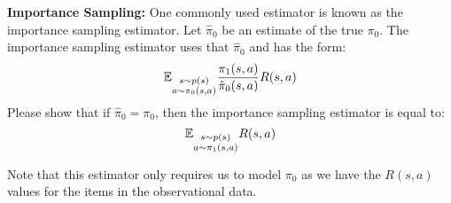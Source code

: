 \item  {} \textbf{Importance Sampling:}  One commonly used estimator is known as the importance sampling estimator. Let $\hat{\pi}_0$ be an estimate of the true $\pi_0$. The importance sampling estimator uses that $\hat{\pi}_0$ and has the form: $$\mathbb{E}_{\substack{s\sim p(s) \\ a \sim \pi_0(s, a)}} \frac{\pi_1(s, a)}{\hat{\pi}_0(s, a)}  R(s, a)$$ Please show that if $\hat{\pi}_0 = \pi_0$, then the importance sampling estimator is equal to: 
$$\mathbb{E}_{\substack{s\sim p(s) \\ a \sim \pi_1(s, a)}} R(s, a)$$

  Note that this estimator only requires us to model $\pi_0$ as we have the $R(s, a)$ values for the items in the observational data.
